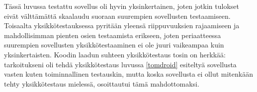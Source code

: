 Tässä luvussa testattu sovellus oli hyvin yksinkertainen, joten jotkin tulokset eivät välttämättä skaalaudu suoraan suurempien sovellusten testaamiseen. Toisaalta yksikkötestauksessa pyritään yleensä riippuvuuksien rajaamiseen ja mahdollisimman pienten osien testaamista erikseen, joten periaatteessa suurempien sovellusten yksikkötestaaminen ei ole juuri vaikeampaa kuin yksinkertaisten. Koodin laadun suhteen yksikkötestaus tosin on herkkää: tarkoitukseni oli tehdä yksikkötestaus luvussa \ref{tomdroid} esiteltyä sovellusta vasten kuten toiminnallinen testauskin, mutta koska sovellusta ei ollut mitenkään tehty yksikkötestaus mielessä, osoittautui tämä mahdottomaksi.